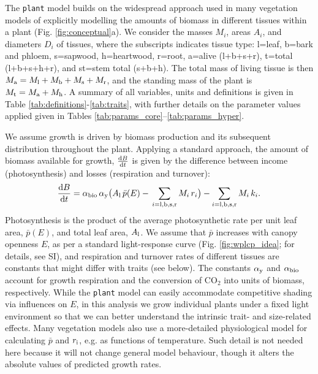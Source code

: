 \documentclass[9pt,twocolumn,twoside,lineno]{pnas-new}
\newcommand{\plant}{\texttt{plant}}
\begin{document}
The {\plant} model builds on the widespread approach used in many vegetation models of explicitly modelling the amounts of biomass in different tissues within a plant \citep[e.g.][]{Givnish-1988, Makela-1997, Moorcroft-2001, Sitch-2008, Falster-2011, King-2011, DeKauwe-2014} (Fig. \ref{fig:conceptual}a). We consider the masses $M_i$, areas $A_i$, and diameters $D_i$ of tissues, where the subscripts indicates tissue type: l=leaf, b=bark and phloem, s=sapwood, h=heartwood, r=root, a=alive (l+b+s+r), t=total (l+b+s+h+r), and st=stem total (s+b+h). The total mass of living tissue is then $M_{\rm a}=M_{\rm l}+M_{\rm b}+M_{\rm s}+M_{\rm r}$, and the standing mass of the plant is $M_{\rm t}=M_{\rm a}+M_{\rm h}$. A summary of all variables, units and definitions is given in Table \ref{tab:definitions}-\ref{tab:traits}, with further details on the parameter values applied given in Tables \ref{tab:params_core}--\ref{tab:params_hyper}.

We assume growth is driven by biomass production and its subsequent distribution throughout the plant. Applying a standard approach, the amount of biomass available for growth, $\frac{{\rm d}B}{{\rm d}t}$ is given by the difference between income (photosynthesis) and losses (respiration and turnover)\citep{Makela-1997, Thornley-2000}:
\begin{equation}\label{eq:dbdt}
\frac{{\rm d}B}{{\rm d}t}
= \alpha_{\rm bio} \,
\alpha_{\rm y}
\big( A_{\rm l} \, \bar{p}(E) -
\, \sum_{i = {\rm l}, {\rm b}, {\rm s}, {\rm r}}{M_i \, r_i}\big)
- \sum_{i = {\rm l}, {\rm b}, {\rm s},  {\rm r}}{M_i \, k_i}.
\end{equation}
Photosynthesis is the product of the average photosynthetic rate per unit leaf area, $\bar{p}(E)$, and total leaf area, $A_{\rm l}$. We assume that $\bar{p}$ increases with canopy openness $E$, as per a standard light-response curve (Fig. \ref{fig:wplcp_idea}; for details, see SI), and respiration and turnover rates of different tissues are constants that might differ with traits (see below). The constants $\alpha_{\rm y}$ and $\alpha_{\rm bio}$ account for growth respiration and the conversion of CO$_2$ into units of biomass, respectively. While the {\plant} model can easily accommodate competitive shading via influences on $E$, in this analysis we grow individual plants under a fixed light environment so that we can better understand the intrinsic trait- and size-related effects. Many vegetation models also use a more-detailed physiological model for calculating $\bar{p}$ and $r_{\rm i}$, e.g. as functions of temperature. Such detail is not needed here because it will not change general model behaviour, though it alters the absolute values of predicted growth rates. 
\end{document}
